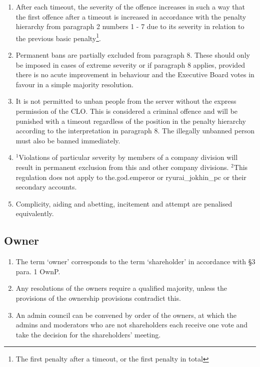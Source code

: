 \documentclass{article}
\begin{document}
\begin{enumerate}[(1)]
	\item After each timeout, the severity of the offence increases in such a way that the first offence after a timeout is increased in accordance with the penalty hierarchy from paragraph 2 numbers 1 - 7 due to its severity in relation to the previous basic penalty\footnote{The first penalty after a timeout, or the first penalty in total}.
	\item Permanent bans are partially excluded from paragraph 8. These should only be imposed in cases of extreme severity or if paragraph 8 applies, provided there is no acute improvement in behaviour and the Executive Board votes in favour in a simple majority resolution.
	\item It is not permitted to unban people from the server without the express permission of the CLO. This is considered a criminal offence and will be punished with a timeout regardless of the position in the penalty hierarchy according to the interpretation in paragraph 8. The illegally unbanned person must also be banned immediately.
	\item $^{1}$Violations of particular severity by members of a company division will result in permanent exclusion from this and other company divisions. $^{2}$This regulation does not apply to the.god.emperor or ryurai\_jokhin\_pc or their secondary accounts.
	\item Complicity, aiding and abetting, incitement and attempt are penalised equivalently.
\end{enumerate}

\subsection{Owner}
\begin{enumerate}[(1)]
	\item The term `owner' corresponds to the term `shareholder' in accordance with §3 para. 1 OwnP.
	\item Any resolutions of the owners require a qualified majority, unless the provisions of the ownership provisions contradict this.
	\item An admin council can be convened by order of the owners, at which the admins and moderators who are not shareholders each receive one vote and take the decision for the shareholders' meeting.
\end{enumerate}
\end{document}
